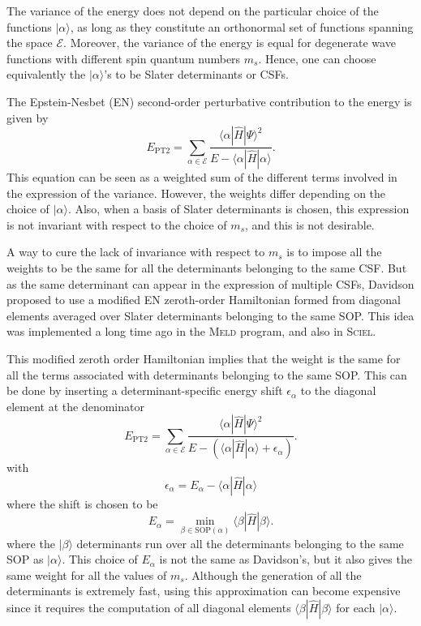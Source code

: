 \documentclass[aip,jcp,reprint,showkeys]{revtex4-1}
\newcommand{\ket}[1]{|#1\rangle}
\newcommand{\sop}{SOP}
\newcommand{\csf}{CSF}
\newcommand{\mel}[3]{\langle #1 | #2 | #3 \rangle}
\newcommand{\ept}{E_\text{PT2}}
\begin{document}
The variance of the energy does not depend on the particular choice of the
functions $\ket{\alpha}$, as long as they constitute an orthonormal set of
functions spanning the space $\mathcal{E}$. Moreover, the variance of the
energy is equal for degenerate wave functions with different spin quantum
numbers $m_s$.  Hence, one can choose equivalently the $\ket{\alpha}$'s to be
Slater determinants or {\csf s}.

The Epstein-Nesbet (EN) second-order perturbative contribution to the energy is given
by
\begin{equation}
\ept = \sum_{\alpha \in \mathcal{E}} \frac{\mel{\alpha}{\hat{H}}{\Psi}^2}{E-\mel{\alpha}{\hat{H}}{\alpha}}.
\label{eq:pt2}
\end{equation}
This equation can be seen as a weighted sum of the different terms involved in
the expression of the variance. However, the weights differ depending on the
choice of $\ket{\alpha}$. Also, when a basis of Slater determinants is chosen,
this expression is not invariant with respect to the choice of $m_s$, and this 
is not desirable.

A way to cure the lack of invariance with respect to $m_s$ is to impose all the weights
to be the same for all the determinants belonging to the same {\csf}. But as 
the same determinant can appear in the expression of multiple {\csf s}, Davidson
proposed to use a modified EN zeroth-order Hamiltonian formed from
diagonal elements averaged over Slater determinants belonging to the same
{\sop}. This idea was implemented a long time ago in the \textsc{Meld} 
program,\cite{Davidson_1979,Kozlowski_1994} and also in \textsc{Sciel}.\cite{Sciel}

This modified zeroth order Hamiltonian implies that the weight is the same for
all the terms associated with determinants belonging to the same {\sop}. This can be done by
inserting a determinant-specific energy shift $\epsilon_\alpha$ to the
diagonal element at the denominator 
\begin{equation}
\ept = \sum_{\alpha \in \mathcal{E}} \frac{\mel{\alpha}{\hat{H}}{\Psi}^2}{E-\left(\mel{\alpha}{\hat{H}}{\alpha}+\epsilon_\alpha \right)}.
\end{equation}
with
\begin{equation}
\epsilon_\alpha = E_\alpha - \mel{\alpha}{\hat{H}}{\alpha} 
\end{equation}
where the shift is chosen to be
\begin{equation}
E_\alpha = \min_{\beta \in \text{\sop}(\alpha)} \mel{\beta}{\hat{H}}{\beta}.
\end{equation}
where the $\ket{\beta}$ determinants run over all the determinants belonging to the
same {\sop} as $\ket{\alpha}$.
This choice of $E_\alpha$ is not the same as Davidson's, but it also
gives the same weight for all the values of $m_s$.
Although the generation of all the determinants is extremely fast, using
this approximation can become expensive since it requires the computation of
all diagonal elements $\mel{\beta}{\hat{H}}{\beta}$ for each
$\ket{\alpha}$.
\end{document}
